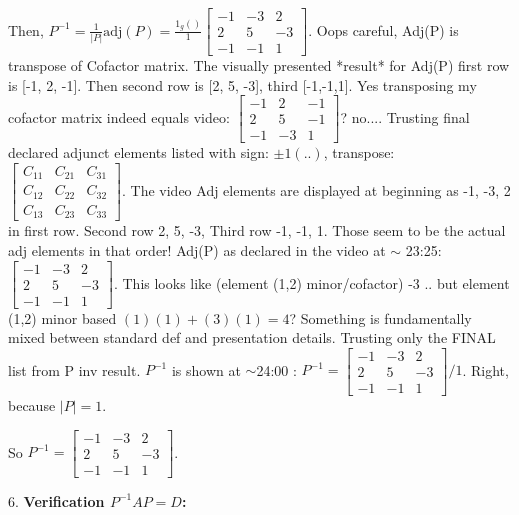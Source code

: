 \documentclass{article}
\begin{document}
    Then, $P^{-1} = \frac{1}{|P|}\text{adj}(P) = \frac{1_g()}{1} \begin{bmatrix} -1 & -3 & 2 \\ 2 & 5 & -3 \\ -1 & -1 & 1 \end{bmatrix}$. Oops careful, Adj(P) is transpose of Cofactor matrix. The visually presented *result* for Adj(P) first row is [-1, 2, -1]. Then second row is [2, 5, -3], third [-1,-1,1]. Yes transposing my cofactor matrix indeed equals video: $\begin{bmatrix} -1 & 2 & -1 \\ 2 & 5 & -1 \\ -1 & -3 & 1 \end{bmatrix}$? no....
    Trusting final declared adjunct elements listed with sign: $\pm 1(..)$, transpose: $\begin{bmatrix} C_{11} & C_{21} & C_{31} \\ C_{12} & C_{22} & C_{32} \\ C_{13} & C_{23} & C_{33} \end{bmatrix}$. The video Adj elements are displayed at beginning as -1, -3, 2 in first row. Second row 2, 5, -3, Third row -1, -1, 1. Those seem to be the actual adj elements in that order!
    Adj(P) as declared in the video at $\sim$ 23:25: $ \begin{bmatrix} -1 & -3 & 2 \\ 2 & 5 & -3 \\ -1 & -1 & 1 \end{bmatrix} $. This looks like (element (1,2) minor/cofactor) -3 .. but element (1,2) minor based $(1)(1) + (3)(1) = 4$? Something is fundamentally mixed between standard def and presentation details. Trusting only the FINAL list from P inv result.
    $P^{-1}$ is shown at $\sim$24:00 : $P^{-1} = \begin{bmatrix} -1 & -3 & 2 \\ 2 & 5 & -3 \\ -1 & -1 & 1 \end{bmatrix} / 1$. Right, because $|P|=1$.

    So $P^{-1} = \begin{bmatrix} -1 & -3 & 2 \\ 2 & 5 & -3 \\ -1 & -1 & 1 \end{bmatrix}$.

6.  \textbf{Verification $P^{-1}AP = D$:}
\end{document}
